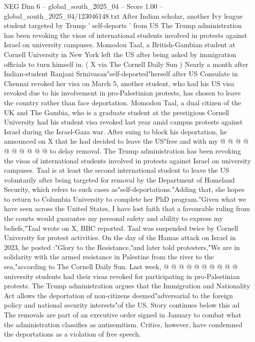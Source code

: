 \begin{textsample}{NEG Dim 6 – global\_south\_2025\_04 – Score 1.00 – global\_south\_2025\_04/123046148.txt}  \label{ex:f6_neg_173}
After Indian scholar, another Ivy league student targeted by Trump ' self-deports ' from US The Trump administration has been revoking the visas of international students involved in protests against Israel on university campuses.
Momodou Taal, a British-Gambian student at Cornell University in New York left the US after being asked by immigration officials to turn himself in. ( X via The Cornell Daily Sun ) Nearly a month after Indian-student Ranjani Srinivasan"self-deported"herself after US Consulate in Chennai revoked her visa on March 5, another student, who had his US visa revoked due to his involvement in pro-Palestinian protests, has chosen to leave the country rather than face deportation.
Momodou Taal, a dual citizen of the UK and The Gambia, who is a graduate student at the prestigious Cornell University had his student visa revoked last year amid campus protests against Israel during the Israel-Gaza war.
After suing to block his deportation, he announced on X that he had decided to leave the US"free and with my @ @ @ @ @ @ @ @ @ @ to delay removal.
The Trump administration has been revoking the visas of international students involved in protests against Israel on university campuses.
Taal is at least the second international student to leave the US voluntarily after being targeted for removal by the Department of Homeland Security, which refers to such cases as"self-deportations."Adding that, she hopes to return to Columbia University to complete her PhD program."Given what we have seen across the United States, I have lost faith that a favourable ruling from the courts would guarantee my personal safety and ability to express my beliefs,"Taal wrote on X, BBC reported.
Taal was suspended twice by Cornell University for protest activities.
On the day of the Hamas attack on Israel in 2023, he posted :"Glory to the Resistance,"and later told protesters,"We are in solidarity with the armed resistance in Palestine from the river to the sea,"according to The Cornell Daily Sun.
Last week, @ @ @ @ @ @ @ @ @ @ university students had their visas revoked for participating in pro-Palestinian protests.
The Trump administration argues that the Immigration and Nationality Act allows the deportation of non-citizens deemed"adversarial to the foreign policy and national security interests"of the US.
Story continues below this ad The removals are part of an executive order signed in January to combat what the administration classifies as antisemitism.
Critics, however, have condemned the deportations as a violation of free speech.

\end{textsample}
